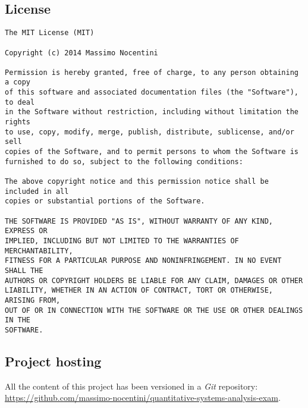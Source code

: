 \documentclass[10pt,a4paper]{article}
\begin{document}
    \subsection{License}
\begin{verbatim}
The MIT License (MIT)

Copyright (c) 2014 Massimo Nocentini

Permission is hereby granted, free of charge, to any person obtaining a copy
of this software and associated documentation files (the "Software"), to deal
in the Software without restriction, including without limitation the rights
to use, copy, modify, merge, publish, distribute, sublicense, and/or sell
copies of the Software, and to permit persons to whom the Software is
furnished to do so, subject to the following conditions:

The above copyright notice and this permission notice shall be included in all
copies or substantial portions of the Software.

THE SOFTWARE IS PROVIDED "AS IS", WITHOUT WARRANTY OF ANY KIND, EXPRESS OR
IMPLIED, INCLUDING BUT NOT LIMITED TO THE WARRANTIES OF MERCHANTABILITY,
FITNESS FOR A PARTICULAR PURPOSE AND NONINFRINGEMENT. IN NO EVENT SHALL THE
AUTHORS OR COPYRIGHT HOLDERS BE LIABLE FOR ANY CLAIM, DAMAGES OR OTHER
LIABILITY, WHETHER IN AN ACTION OF CONTRACT, TORT OR OTHERWISE, ARISING FROM,
OUT OF OR IN CONNECTION WITH THE SOFTWARE OR THE USE OR OTHER DEALINGS IN THE
SOFTWARE.
\end{verbatim}

    \subsection{Project hosting}
    All the content of this project has been versioned in a \emph{Git} repository:\\
    \url{https://github.com/massimo-nocentini/quantitative-systems-analysis-exam}.\\
\end{document}
